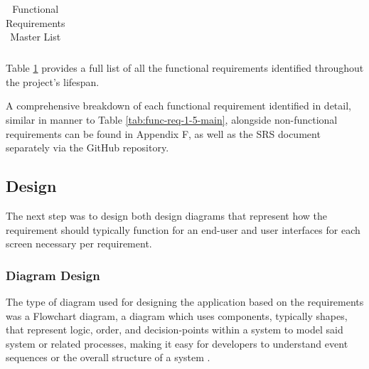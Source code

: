 \documentclass[12pt]{article}
\begin{document}
\begin{table}[H]
{\begin{tabular}{@{}l|ll@{}}
\end{tabular}%
}
\caption{Functional Requirements Master List}
\label{tab:func-req-master-list}
\end{table}

Table \ref{tab:func-req-master-list} provides a full list of all the functional requirements identified throughout the project's lifespan. 


A comprehensive breakdown of each functional 
requirement identified in detail, similar in manner to Table \ref{tab:func-req-1-5-main}, alongside non-functional requirements can be found in Appendix F, as well as the SRS document separately 
via the GitHub repository.


\newpage

\subsection{Design}
The next step was to design both design diagrams that represent how the requirement should typically function for an 
end-user and user interfaces for each screen necessary per requirement. 



\subsubsection{Diagram Design}

The type of diagram used for designing the application based on the requirements was a Flowchart diagram, a diagram which uses components, typically shapes, that represent logic, order, and decision-points within a system
to model said system or related processes, making it easy for developers to understand event sequences or the overall structure of a system .
\end{document}
